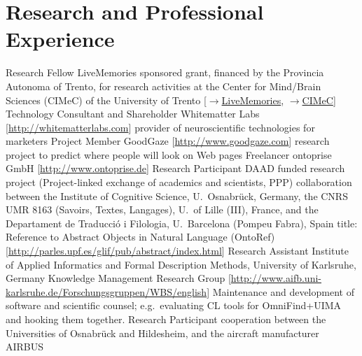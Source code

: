\documentclass[11pt,a4paper]{moderncv}
\begin{document}
\pagebreak
\section{Research and Professional Experience}
        {Research Fellow}
        {LiveMemories sponsored grant, financed by the Provincia Autonoma of
        Trento, for research activities at the Center for Mind/Brain Sciences
        (CIMeC) of the University of Trento [\href{http://www.livememories.org}
        {$\rightarrow$LiveMemories},
        \href{http://www.cimec.unitn.it}{$\rightarrow$CIMeC}]}
        {}{}{}
        {Technology Consultant and Shareholder}
        {Whitematter Labs [\url{http://whitematterlabs.com}]}
        {\small provider of neuroscientific technologies for marketers}
        {}{}
        {Project Member}
        {GoodGaze [\url{http://www.goodgaze.com}]}
        {\small research project to predict where people will look on Web pages}
        {}{}
        {Freelancer}
        {ontoprise GmbH [\url{http://www.ontoprise.de}]}
        {}{}{}
        {Research Participant}
        {DAAD funded research project (Project-linked exchange of academics and
        scientists, PPP)}
        {\small collaboration between the Institute of Cognitive Science,
        U.~Osnabr\"{u}ck, Germany, the CNRS UMR 8163 (Savoirs, Textes,
        Langages), U.~of Lille (III), France, and the Departament de
        Traducci\'{o} i Filologia, U.~Barcelona (Pompeu Fabra), Spain}
        {\small title: Reference to Abstract Objects in Natural Language
        (OntoRef) [\url{http://parles.upf.es/glif/pub/abstract/index.html}]}
        {}
        {Research Assistant}
        {Institute of Applied Informatics and Formal Description Methods,
        University of Karlsruhe, Germany} {\small Knowledge Management Research
        Group}
        {[\url{http://www.aifb.uni-karlsruhe.de/Forschungsgruppen/WBS/english}]}
        {Maintenance and development of software and scientific counsel;
        e.g.~evaluating CL tools for OmniFind+UIMA and hooking them together.}
        {Research Participant}
        {cooperation between the Universities of Osnabr\"{u}ck and Hildesheim,
        and the aircraft manufacturer AIRBUS}
\end{document}
